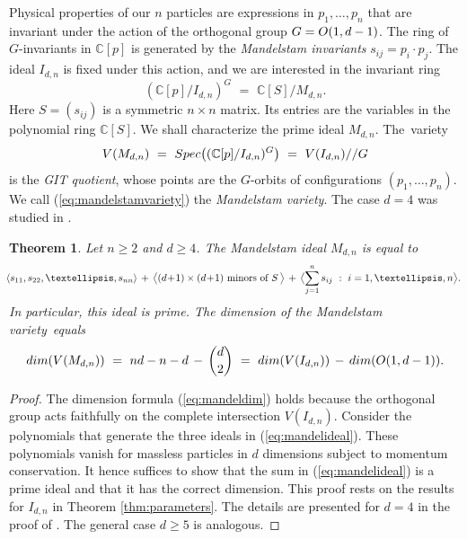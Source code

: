 \documentclass[english]{ourlematema}
\newtheorem{theorem}{Theorem}
\numberwithin{theorem}{section}
\theoremstyle{definition}
\newcommand{\CC}{\mathbb{C}}
\begin{document}
Physical properties of our $n$ particles are
expressions in $p_1,\ldots,p_n$ that are
invariant under the action of the orthogonal group
$G = {\rm O}(1,d-1)$. The ring of $G$-invariants in $\CC[p]$
is generated by the {\em Mandelstam invariants} 
 $s_{ij} = p_i \cdot p_j$. 
 The ideal $I_{d,n}$ is fixed under this action,
 and we are interested in the invariant ring
 \begin{equation}
 \label{eq:Ginvariants}  (\CC[p]/I_{d,n})^G  \,\, = \,\, \CC[S]/M_{d,n} . 
 \end{equation}
Here $S = (s_{ij})$ is a symmetric $n \times n$ matrix. Its
entries are the variables in the polynomial ring $\CC[S]$. We shall
characterize the prime ideal $M_{d,n}$. The~variety
\begin{equation}
\label{eq:mandelstamvariety}
 V(M_{d,n}) \,\,=\,\, {\rm Spec}\bigl((\CC[p]/I_{d,n})^G\bigr) \,\,=\,\, V(I_{d,n}) // G  
 \end{equation}
is the {\em GIT quotient}, whose points are the $G$-orbits
of configurations $(p_1,\ldots,p_n)$.
We call (\ref{eq:mandelstamvariety}) the {\em Mandelstam variety}.
The case $d=4$ was studied in \cite[Section~4]{EPS}.

\begin{theorem}
Let $n \geq 2$ and $d \geq 4$.  The Mandelstam ideal $M_{d,n}$ is equal to
\begin{equation}
\label{eq:mandelideal}  \!\!   \langle s_{11}, s_{22}, \ldots, s_{nn} \rangle \,+\, \bigl\langle
(d\!+\!1) \times (d\!+\!1) \,\,\hbox{minors of}\,\, S  \,\bigr\rangle \,+\,
\bigl\langle \sum_{j=1}^n s_{ij} \,\,:\,\, i = 1,\ldots ,n \bigr\rangle.
\end{equation}
In particular, this ideal is prime.
The dimension of the Mandelstam variety~equals
\begin{equation}
\label{eq:mandeldim}
 {\rm dim}(V(M_{d,n})) \,\, = \,\, 
 nd-n-d \,-\, \binom{d}{2} \,\,=\,\, {\rm dim}(V(I_{d,n})) \,-\, {\rm dim}({\rm O}(1,d-1)). 
 \end{equation}
\end{theorem}

\begin{proof}
The dimension formula (\ref{eq:mandeldim}) 
holds because the orthogonal group  acts
faithfully on the complete intersection $V(I_{d,n})$.
Consider the polynomials that generate the
three  ideals in (\ref{eq:mandelideal}). These polynomials
vanish for massless particles in $d$ dimensions subject to
momentum conservation. It hence suffices to show
that the sum in (\ref{eq:mandelideal}) is a prime ideal and that it
has the correct dimension.
This proof rests on the results for $I_{d,n}$ in Theorem \ref{thm:parameters}.
The details are presented for $d=4$ in the proof of 
\cite[Theorem 4.5]{EPS}. The general case $d \geq 5$ is analogous.
\end{proof}
\end{document}
